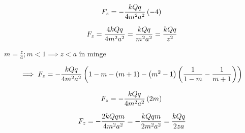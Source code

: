 \documentclass[12pt]{article}
\begin{document}
\begin{equation}
    F_{z} =- \frac{ kQq }{ 4m^{2} a^{2} } \left(  -4\right) \\
\end{equation}

\begin{equation}
    F_{z} = \frac{ 4kQq }{ 4m^{2} a^{2} } = \frac{kQq}{m^{2}a^{2}}=\frac{kQq}{z^{2}} \\
\end{equation}

$ m=\frac{z}{a} ; m<1 \implies z < a$ în minge 

\begin{equation}
   \implies F_{z} =- \frac{ kQq }{ 4m^{2} a^{2} } \left(  1-m  - ( m + 1)  - \left( m^{2} - 1 \right) \left( \frac{1}{  1 - m  } - \frac{1}{  m + 1  } \right) \right)\\
\end{equation}

\begin{equation}
    F_{z} =- \frac{ kQq }{ 4m^{2} a^{2} } \left( 2m \right) \\
\end{equation}

\begin{equation}
    F_{z} = -\frac{ 2kQqm }{ 4m^{2} a^{2} } = -\frac{kQqm}{2m^{2} a^{2}}=\frac{kQq}{2 z a} \\
\end{equation}
\end{document}
